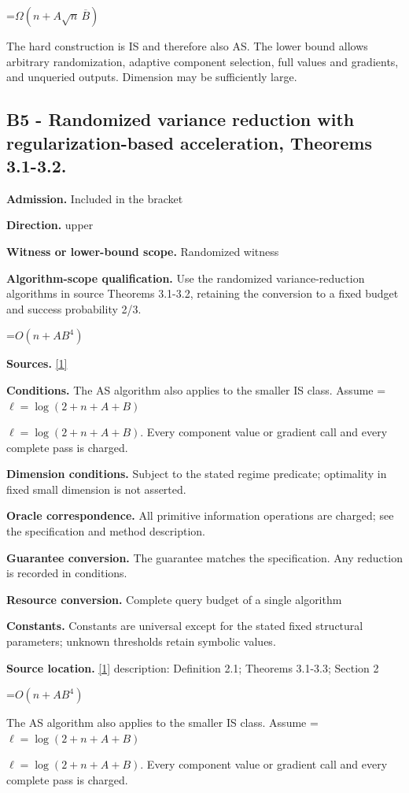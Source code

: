 \documentclass[10pt,a4paper]{article}
\newcommand{\AtlasMath}[1]{\par\begingroup\centering\setbox0=\hbox{$\displaystyle #1$}\ifdim\wd0>1.4\linewidth\typeout{ATLAS WIDE FORMULA: \the\wd0}\fi\ifdim\wd0>\linewidth\resizebox{\linewidth}{!}{\box0}\else\box0\fi\par\endgroup}
\newcommand{\AtlasInlineMath}[1]{\begingroup\setbox0=\hbox{$#1$}\ifdim\wd0>.4\linewidth\endgroup\AtlasMath{#1}\else\endgroup$#1$\fi}
\begin{document}
\AtlasMath{\Omega(n+A\sqrt n\,\overline B)}
The hard construction is IS and therefore also AS. The lower bound allows arbitrary randomization, adaptive component selection, full values and gradients, and unqueried outputs. Dimension may be sufficiently large.

\subsection{B5 - Randomized variance reduction with regularization-based acceleration, Theorems 3.1-3.2.}
\textbf{Admission.} Included in the bracket

\textbf{Direction.} upper

\textbf{Witness or lower-bound scope.} Randomized witness

\textbf{Algorithm-scope qualification.} Use the randomized variance-reduction algorithms in source Theorems 3.1-3.2, retaining the conversion to a fixed budget and success probability 2/3.

\AtlasMath{O(n+AB^4)}
\textbf{Sources.} \href{https://arxiv.org/pdf/2610.16991v2}{[1]}

\textbf{Conditions.} The AS algorithm also applies to the smaller IS class. Assume \AtlasInlineMath{\ell=\log(2+n+A+B)}. Every component value or gradient call and every complete pass is charged.

\textbf{Dimension conditions.} Subject to the stated regime predicate; optimality in fixed small dimension is not asserted.

\textbf{Oracle correspondence.} All primitive information operations are charged; see the specification and method description.

\textbf{Guarantee conversion.} The guarantee matches the specification. Any reduction is recorded in conditions.

\textbf{Resource conversion.} Complete query budget of a single algorithm

\textbf{Constants.} Constants are universal except for the stated fixed structural parameters; unknown thresholds retain symbolic values.

\textbf{Source location.} \href{https://arxiv.org/pdf/2610.16991v2}{[1]} description: Definition 2.1; Theorems 3.1-3.3; Section 2

\AtlasMath{O(n+AB^4)}
The AS algorithm also applies to the smaller IS class. Assume \AtlasInlineMath{\ell=\log(2+n+A+B)}. Every component value or gradient call and every complete pass is charged.
\end{document}
